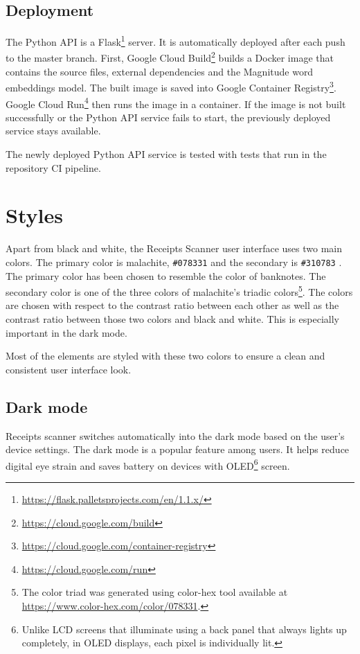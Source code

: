 \documentclass[
  printed, %
  table,   %
  oneside, %
  lof,     %
  lot,     %
]{fithesis3}
\makeatletter
\def\testclr#1#{\@testclr{#1}}
\def\@testclr#1#2{{\fboxsep\z@\fbox{\colorbox#1{#2}{\phantom{XX}}}}}
\makeatother
\begin{document}
\subsection{Deployment}
The Python API is a Flask\footnote{\url{https://flask.palletsprojects.com/en/1.1.x/}} server. 
It is automatically deployed after each push to the master branch.
First, Google Cloud Build\footnote{\url{https://cloud.google.com/build}} builds a Docker image that contains the source files, external dependencies and the Magnitude word embeddings model. The built image is saved into Google Container Registry\footnote{\url{https://cloud.google.com/container-registry}}. Google Cloud Run\footnote{\url{https://cloud.google.com/run}} then runs the image in a container.
If the image is not built successfully or the Python API service fails to start, the previously deployed service stays available.

The newly deployed Python API service is tested with tests that run in the repository CI pipeline.

\section{Styles}
Apart from black and white, the Receipts Scanner user interface uses two main colors. The primary color is malachite, \texttt{\#078331}  and the secondary is \texttt{\#310783} . The primary color has been chosen to resemble the color of banknotes. The secondary color is one of the three colors of malachite's triadic colors\footnote{The color triad was generated using color-hex tool available at \url{https://www.color-hex.com/color/078331}.}. 
The colors are chosen with respect to the contrast ratio between each other as well as the contrast ratio between those two colors and black and white. This is especially important in the dark mode.

Most of the elements are styled with these two colors to ensure a clean and consistent user interface look.

\subsection{Dark mode}
Receipts scanner switches automatically into the dark mode based on the user's device settings. The dark mode is a popular feature among users. It helps reduce digital eye strain and saves battery on devices with OLED\footnote{Unlike LCD screens that illuminate using a back panel that always lights up completely, in OLED displays, each pixel is individually lit.} screen.
\end{document}
